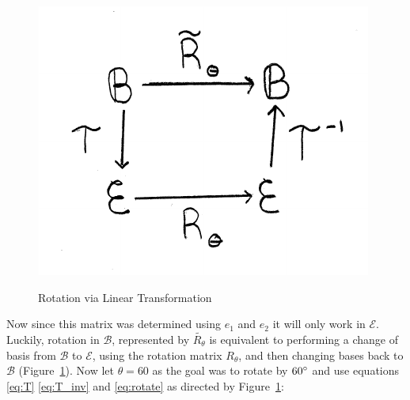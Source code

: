 \documentclass[12pt,letter]{article}
\begin{document}
\begin{figure}
	\centering
	\caption{Rotation via Linear Transformation}
	\includegraphics[width=.3\textwidth]{linear_trans.pdf}
	\vspace{-30pt}
	\label{fig:linear_transform}
\end{figure}
%
Now since this matrix was determined using $e_1$ and $e_2$ it will only work in $\mathcal{E}$. Luckily, rotation in $\mathcal{B}$, represented by $\widetilde{R_\theta}$ is equivalent to performing a change of basis from $\mathcal{B}$ to $\mathcal{E}$, using the rotation matrix $R_\theta$, and then changing bases back to $\mathcal{B}$ (Figure~\ref{fig:linear_transform}). Now let $\theta = 60$ as the goal was to rotate by $60\degree$ and use equations \ref{eq:T} \ref{eq:T_inv} and \ref{eq:rotate} as directed by Figure~\ref{fig:linear_transform}:
%
\end{document}
